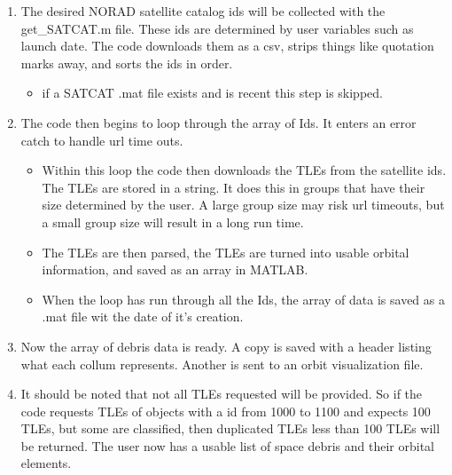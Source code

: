 \documentclass[12pt]{report}
\begin{document}
	\begin{enumerate}
		\item The desired NORAD satellite catalog ids will be collected with the get\_SATCAT.m file. These ids are determined by user variables such as launch date. The code downloads them as a csv, strips things like quotation marks away, and sorts the ids in order.
		\begin{itemize}
			\item if a SATCAT .mat file exists and is recent this step is skipped.
		\end{itemize}  
	\item The code then begins to loop through the array of Ids. It enters an error catch to handle url time outs. 
		\begin{itemize}
		\item Within this loop the code then downloads the TLEs from the satellite ids. The TLEs are stored in a string. It does this in groups that have their size determined by the user. A large group size may risk url timeouts, but a small group size will result in a long run time.
		\item The TLEs are then parsed, the TLEs are turned into usable orbital information, and saved as an array in MATLAB.
		\item When the loop has run through all the Ids, the array of data is saved as a .mat file wit the date of it's creation.
	\end{itemize} 
\item Now the array of debris data is ready. A copy is saved with a header listing what each collum represents. Another is sent to an orbit visualization file. 

\item  It should be noted that not all TLEs requested will be provided. So if the code requests TLEs of objects with a id from 1000 to 1100 and expects 100 TLEs, but some are classified, then duplicated TLEs less than 100 TLEs will be returned. The user now has a usable list of space debris and their orbital elements.
	
	\end{enumerate}
\end{document}
